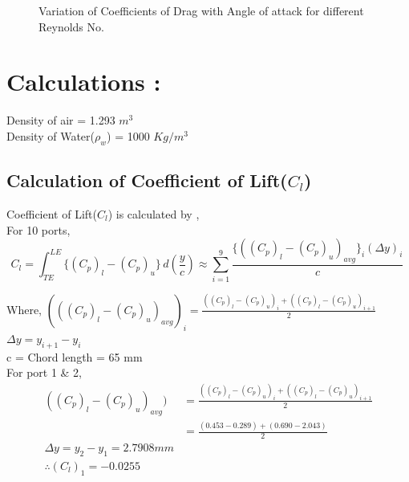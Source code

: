 \documentclass[12pt,a4paper]{article}
\begin{document}
\begin{figure}[!ht]
	\begin{center}
	\end{center}
	\caption{Variation of Coefficients of Drag with Angle of attack for different Reynolds No.}
\end{figure}

\clearpage
 

\section{Calculations :}
Density of air = 1.293 $m^3$ \\
Density of Water($\rho_{w}$) = 1000 $Kg/m^3$

\subsection{Calculation of Coefficient of Lift($C_l$)}
Coefficient of Lift($C_l$) is calculated by , \\
For 10 ports,\[ C_l = \int_{TE}^{LE} \{(C_p)_{l} - (C_p)_{u}\} \,d(\frac{y}{c})  \approx  \sum_{i=1}^{9} \frac{\{((C_p)_{l} - (C_p)_{u})_{avg}\}_i (\Delta y)_i}{c}\ \]

Where, $ (((C_p)_{l} - (C_p)_{u})_{avg})_i = \frac{((C_p)_{l} - (C_p)_{u})_{i}+((C_p)_{l} - (C_p)_{u})_{i+1}}{2}$ \\
$\Delta y = y_{i+1} - y_i$ \\
c = Chord length = 65 mm\\



For port 1 \& 2, \\
\begin{align*}
    ((C_p)_{l} - (C_p)_{u})_{avg}) &=  \frac{((C_p)_{l} - (C_p)_{u})_{i}+((C_p)_{l} - (C_p)_{u})_{i+1}}{2} \\
    &=\frac{(0.453-0.289)+(0.690-2.043)}{2} \\
    \Delta y = y_{2}-y_{1} = 2.7908 mm\\
    \therefore (C_l)_1 = -0.0255
\end{align*}
\end{document}
